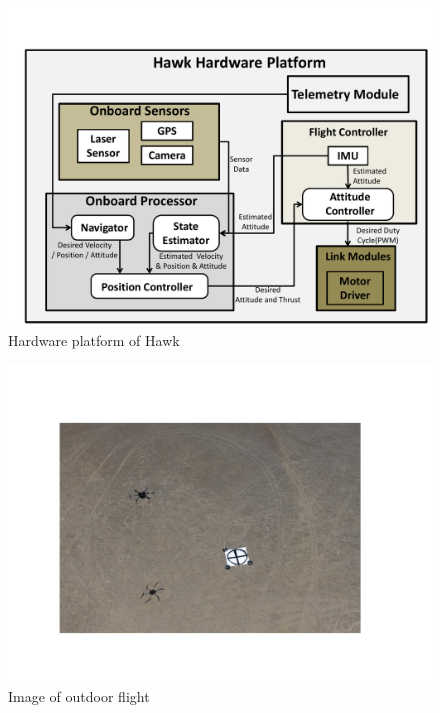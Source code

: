 \documentclass{standalone}
\begin{document}
\begin{figure}[h]
  \begin{center}
    \includegraphics[clip,  bb=0 0 720 500,  width=\columnwidth]{sections/task1/images/hawk-platform.pdf}
    \caption{Hardware platform of Hawk}
    \label{fig:task1-uav-platform}
  \end{center}
\end{figure} 

\begin{figure}[h]
  \begin{center}
    \includegraphics[clip,  bb=88 84 599 440,  width=\columnwidth]{sections/task1/images/task1-outdoor.pdf}
    \caption{Image of outdoor flight }
    \label{fig:task1-outdoor-flight}
  \end{center}
\end{figure} 
\end{document}
